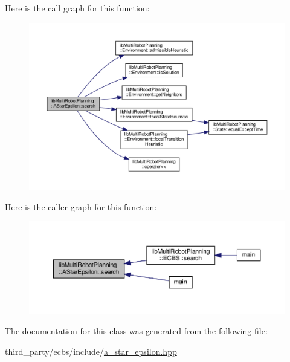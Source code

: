 Here is the call graph for this function\+:
\nopagebreak
\begin{figure}[H]
\begin{center}
\leavevmode
\includegraphics[width=350pt]{classlib_multi_robot_planning_1_1_a_star_epsilon_a24eddac1c20a92f7a58d4865b13a0186_cgraph}
\end{center}
\end{figure}
Here is the caller graph for this function\+:
\nopagebreak
\begin{figure}[H]
\begin{center}
\leavevmode
\includegraphics[width=350pt]{classlib_multi_robot_planning_1_1_a_star_epsilon_a24eddac1c20a92f7a58d4865b13a0186_icgraph}
\end{center}
\end{figure}


The documentation for this class was generated from the following file\+:\begin{DoxyCompactItemize}
\item 
third\+\_\+party/ecbs/include/\hyperlink{a__star__epsilon_8hpp}{a\+\_\+star\+\_\+epsilon.\+hpp}\end{DoxyCompactItemize}
